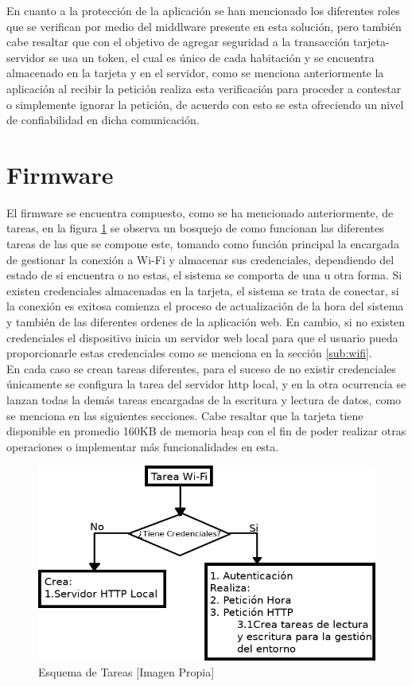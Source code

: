 En cuanto a la protección de la aplicación se han mencionado los diferentes roles que se verifican por medio del middlware presente en esta solución, pero también cabe resaltar que con el objetivo de agregar seguridad a la transacción tarjeta-servidor se usa un token, el cual es único de cada habitación y se encuentra almacenado en la tarjeta y en el servidor, como se menciona anteriormente la aplicación al recibir la petición realiza esta verificación para proceder a contestar o simplemente ignorar la petición, de acuerdo con esto se esta ofreciendo un nivel de confiabilidad en dicha comunicación.

\section{Firmware}

El firmware se encuentra compuesto, como se ha mencionado anteriormente, de tareas, en la figura \ref{fig:tareas} se observa un bosquejo de como funcionan las diferentes tareas de las que se compone este, tomando como función principal la encargada de gestionar la conexión a Wi-Fi y almacenar sus credenciales, dependiendo del estado de si encuentra o no estas, el sistema se comporta de una u otra forma. Si existen credenciales almacenadas en la tarjeta, el sistema se trata de conectar, si la conexión es exitosa comienza el proceso de actualización de la hora del sistema y también de las diferentes ordenes de la aplicación web. En cambio, si no existen credenciales el dispositivo inicia un servidor web local para que el usuario pueda proporcionarle estas credenciales como se menciona en la sección \ref{sub:wifi}.\\

En cada caso se crean tareas diferentes, para el suceso de no existir credenciales únicamente se configura la tarea del servidor http local, y en la otra ocurrencia se lanzan todas la demás tareas encargadas de la escritura y lectura de datos, como se menciona en las siguientes secciones. Cabe resaltar que la tarjeta tiene disponible en promedio 160KB de memoria heap con el fin de poder realizar otras operaciones o implementar más funcionalidades en esta.\\

\begin{figure}[H]
	\centering
	\caption{Esquema de Tareas [Imagen Propia]}
	\label{fig:tareas}
	\includegraphics[width=0.7\linewidth]{Imagenes/tareas}
\end{figure}

